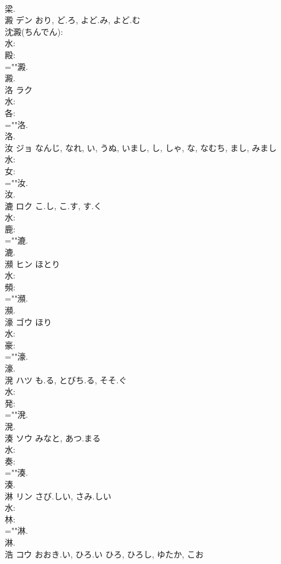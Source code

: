 \documentclass[8pt]{extreport}
\begin{document}
\begin{CJK}{UTF8}{min}
\\	梁.
\\	澱	デン	おり, ど.ろ, よど.み, よど.む		
\\	沈澱(ちんでん): 
\\	水: 
\\	殿: 
\\	=""澱.
\\	澱.
\\	洛	ラク			
\\	水: 
\\	各: 
\\	=""洛.
\\	洛.
\\	汝	ジョ	なんじ, なれ, い, うぬ, いまし, し, しゃ, な, なむち, まし, みまし		
\\	水: 
\\	女: 
\\	=""汝.
\\	汝.
\\	漉	ロク	こ.し, こ.す, す.く		
\\	水: 
\\	鹿: 
\\	=""漉.
\\	漉.
\\	瀕	ヒン	ほとり		
\\	水: 
\\	頻: 
\\	=""瀕.
\\	瀕.
\\	濠	ゴウ	ほり		
\\	水: 
\\	豪: 
\\	=""濠.
\\	濠.
\\	溌	ハツ	も.る, とびち.る, そそ.ぐ		
\\	水: 
\\	発: 
\\	=""溌.
\\	溌.
\\	湊	ソウ	みなと, あつ.まる		
\\	水: 
\\	奏: 
\\	=""湊.
\\	湊.
\\	淋	リン	さび.しい, さみ.しい		
\\	水: 
\\	林: 
\\	=""淋.
\\	淋.
\\	浩	コウ	おおき.い, ひろ.い	ひろ, ひろし, ゆたか, こお	

\end{CJK}
\end{document}
